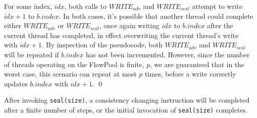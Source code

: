 \begin{prooftwo}
For some index, $idx$, both calls to $WRITE_{adv}$ and $WRITE_{seal}$ attempt
to write $idx+1$ to $b.index$. In both cases, it's possible that another
thread could complete either $WRITE_{adv}$ or $WRITE_{seal}$, once again
writing $idx$ to $b.index$ after the current thread has completed, in effect
overwriting the current thread's write with $idx+1$. By inspection of the
pseudocode, both $WRITE_{adv}$ and $WRITE_{seal}$ will be repeated if
$b.index$ has not been incremented. However, since the number of threads
operating on the FlowPool is finite, $p$, we are guaranteed that in the worst
case, this scenario can repeat at most $p$ times, before a write correctly
updates $b.index$ with $idx+1$.
\qed
\end{prooftwo}


\begin{lemmatwo}\label{lemma-finite-steps-consistency-change}
After invoking \verb=seal(size)=, a consistency changing instruction will be
completed after a finite number of steps, or the initial invocation of
\verb=seal(size)= completes.
\end{lemmatwo}

